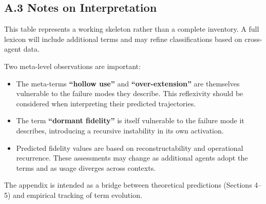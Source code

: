 \documentclass[11pt]{article}
\begin{document}
\newpage
\subsection*{A.3 Notes on Interpretation}

This table represents a working skeleton rather than a complete inventory. A full lexicon will include additional terms and may refine classifications based on cross-agent data.

Two meta-level observations are important:

\begin{itemize}
\item The meta-terms \textbf{``hollow use''} and \textbf{``over-extension''} are themselves vulnerable to the failure modes they describe. This reflexivity should be considered when interpreting their predicted trajectories.

\item The term \textbf{``dormant fidelity''} is itself vulnerable to the failure mode it describes, introducing a recursive instability in its own activation.

\item Predicted fidelity values are based on reconstructability and operational recurrence. These assessments may change as additional agents adopt the terms and as usage diverges across contexts.
\end{itemize}

The appendix is intended as a bridge between theoretical predictions (Sections 4--5) and empirical tracking of term evolution.

\end{document}
